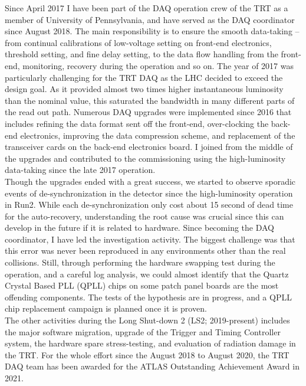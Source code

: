 \documentclass[12pt]{article}
\begin{document}
Since April 2017 I have been part of the DAQ operation crew of the TRT as a member of University of Pennsylvania,
and have served as the DAQ coordinator since August 2018.
The main responsibility is to ensure the smooth data-taking -- from continual calibrations of low-voltage setting on front-end electronics, threshold setting, and fine delay setting,
to the data flow handling from the front-end, monitoring, recovery during the operation and so on.
The year of 2017 was particularly challenging for the TRT DAQ as the LHC decided to exceed the design goal. 
As it provided almost two times higher instantaneous luminosity than the nominal value, this saturated the bandwidth in many different parts of the read out path.
Numerous DAQ upgrades were implemented since 2016 that includes refining the data format sent off the front-end, 
over-clocking the back-end electronics, 
improving the data compression scheme,
and replacement of the transceiver cards on the back-end electronics board.
I joined from the middle of the upgrades and contributed to the commissioning using the high-luminosity data-taking since the late 2017 operation. \\

Though the upgrades ended with a great success, we started to observe sporadic events of de-synchronization in the detector since the high-luminosity operation in Run2.
While each de-synchronization only cost about 15 second of dead time for the auto-recovery, 
understanding the root cause was crucial since this can develop in the future if it is related to hardware.
Since becoming the DAQ coordinator, I have led the investigation activity.
The biggest challenge was that this error was never been reproduced in any environments other than the real collisions.
Still, through performing the hardware swapping test during the operation, and a careful log analysis,
we could almost identify that the Quartz Crystal Based PLL (QPLL) chips on some patch panel boards are the most offending components.
The tests of the hypothesis are in progress, and a QPLL chip replacement campaign is planned once it is proven. \\

The other activities during the Long Shut-down 2 (LS2; 2019-present) includes the major software migration, 
upgrade of the Trigger and Timing Controller system, the hardware spare stress-testing, and evaluation of radiation damage in the TRT.
For the whole effort since the August 2018 to August 2020, the TRT DAQ team has been awarded for the ATLAS Outstanding Achievement Award in 2021. \\
\end{document}

